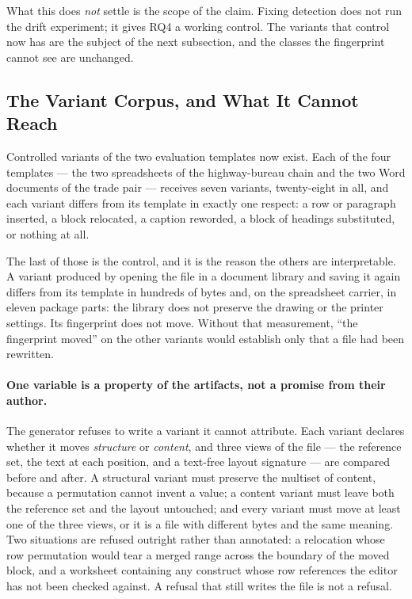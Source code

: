 What this does \emph{not} settle is the scope of the claim. Fixing detection does not run
the drift experiment; it gives RQ4 a working control. The variants that control now has are
the subject of the next subsection, and the classes the fingerprint cannot see are unchanged.

\subsection{The Variant Corpus, and What It Cannot Reach}
\label{sec:eval:drift:corpus}


Controlled variants of the two evaluation templates now exist. Each of the four templates ---
the two spreadsheets of the highway-bureau chain and the two Word documents of the trade pair
--- receives seven variants, twenty-eight in all, and each variant differs from its template in
exactly one respect: a row or paragraph inserted, a block relocated, a caption reworded, a
block of headings substituted, or nothing at all.

The last of those is the control, and it is the reason the others are interpretable. A variant
produced by opening the file in a document library and saving it again differs from its
template in hundreds of bytes and, on the spreadsheet carrier, in eleven package parts: the
library does not preserve the drawing or the printer settings. Its fingerprint does not move.
Without that measurement, ``the fingerprint moved'' on the other variants would establish only
that a file had been rewritten.

\paragraph{One variable is a property of the artifacts, not a promise from their author.}
The generator refuses to write a variant it cannot attribute. Each variant declares whether it
moves \emph{structure} or \emph{content}, and three views of the file --- the reference set, the
text at each position, and a text-free layout signature --- are compared before and after. A
structural variant must preserve the multiset of content, because a permutation cannot invent a
value; a content variant must leave both the reference set and the layout untouched; and every
variant must move at least one of the three views, or it is a file with different bytes and the
same meaning. Two situations are refused outright rather than annotated: a relocation whose row
permutation would tear a merged range across the boundary of the moved block, and a worksheet
containing any construct whose row references the editor has not been checked against. A
refusal that still writes the file is not a refusal.

